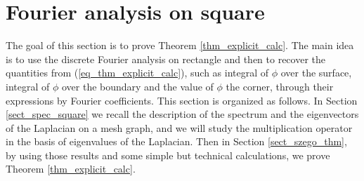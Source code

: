 \documentclass[12pt]{article}
\numberwithin{equation}{section}
\theoremstyle{theorem}
\theoremstyle{definition}
\theoremstyle{remark}
\begin{document}
\section{Fourier analysis on square}\label{sect_four_an_sq}
	The goal of this section is to prove Theorem \ref{thm_explicit_calc}. The main idea is to use the discrete Fourier analysis on rectangle and then to recover the quantities from (\ref{eq_thm_explicit_calc}), such as integral of $\phi$ over the surface, integral of $\phi$ over the boundary and the value of $\phi$ the corner, through their expressions by Fourier coefficients.
	This section is organized as follows. In Section \ref{sect_spec_square} we recall the description of the spectrum and the eigenvectors of the Laplacian on a mesh graph, and we will study the multiplication operator in the basis of eigenvalues of the Laplacian.
	Then in Section \ref{sect_szego_thm}, by using those results and some simple but technical calculations, we prove Theorem \ref{thm_explicit_calc}.
\end{document}
